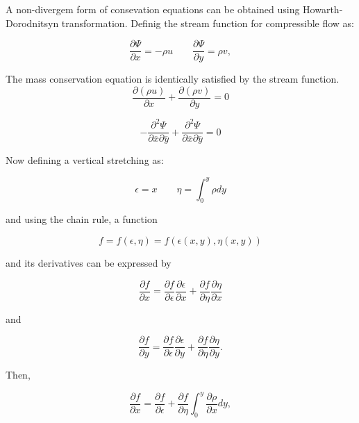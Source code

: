A non-divergem form of consevation equations  can be obtained 
using Howarth-Dorodnitsyn transformation. 
Definig the stream function for compressible flow as: 

\begin{equation}
\frac{\partial \Psi}{\partial x}=-\rho u \qquad
\frac{\partial \Psi}{\partial y}=\rho v,
\end{equation} 

The mass conservation equation is identically satisfied by 
the stream function.
%
%
\begin{equation}
\frac{\partial{(\rho u)}}{\partial x}
+
\frac{\partial{(\rho v)}}{\partial y}
=0
\end{equation}

\begin{equation}
-\frac{\partial^2 \Psi }{\partial  \overline{x}\partial \overline{y}}
+
\frac{\partial^2 \Psi }{\partial \overline{x}\partial \overline{y}}
=0
\end{equation}

Now defining a vertical stretching as:

\begin{equation}
\epsilon =x\qquad
\eta=\int_0^{y}\rho dy%
\end{equation} 

and using the chain rule, a function

\begin{equation}
f
=
f(\epsilon,\eta)=
f(\epsilon(x,y),\eta(x,y))
\end{equation} 


and its derivatives 
can be expressed by

\begin{equation}
\frac{\partial f}{\partial x}
=
\frac{\partial f}{\partial \epsilon}
\frac{\partial \epsilon}{\partial x}
+
\frac{\partial f}{\partial \eta}
\frac{\partial \eta}{\partial x}
\end{equation} 

and 

\begin{equation}
\frac{\partial f}{\partial y}=
\frac{\partial f}{\partial \epsilon}
\frac{\partial \epsilon}{\partial y}
+
\frac{\partial f}{\partial \eta}
\frac{\partial \eta}{\partial y}
.
\end{equation} 

Then,

\begin{equation}
\frac{\partial f}{\partial x}=
\frac{\partial f}{\partial \epsilon}
+
\frac{\partial f}{\partial \eta}
\int_0^{y}\frac{\partial \rho }{\partial x}dy
,
\end{equation} 

